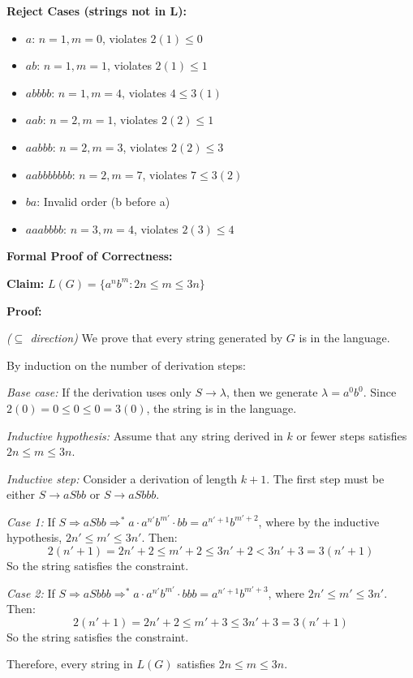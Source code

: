 \documentclass[12pt]{article}
\begin{document}
\textbf{Reject Cases (strings not in L):}
\begin{itemize}
\item $a$: $n=1, m=0$, violates $2(1) \le 0$ \texttimes
\item $ab$: $n=1, m=1$, violates $2(1) \le 1$ \texttimes
\item $abbbb$: $n=1, m=4$, violates $4 \le 3(1)$ \texttimes
\item $aab$: $n=2, m=1$, violates $2(2) \le 1$ \texttimes
\item $aabbb$: $n=2, m=3$, violates $2(2) \le 3$ \texttimes
\item $aabbbbbbb$: $n=2, m=7$, violates $7 \le 3(2)$ \texttimes
\item $ba$: Invalid order (b before a) \texttimes
\item $aaabbbb$: $n=3, m=4$, violates $2(3) \le 4$ \texttimes
\end{itemize}

\textbf{Formal Proof of Correctness:}

\textbf{Claim:} $L(G) = \{a^n b^m : 2n \le m \le 3n\}$

\textbf{Proof:}

\textit{($\subseteq$ direction)} We prove that every string generated by $G$ is in the language.

By induction on the number of derivation steps:

\textit{Base case:} If the derivation uses only $S \rightarrow \lambda$, then we generate $\lambda = a^0 b^0$. Since $2(0) = 0 \le 0 \le 0 = 3(0)$, the string is in the language.

\textit{Inductive hypothesis:} Assume that any string derived in $k$ or fewer steps satisfies $2n \le m \le 3n$.

\textit{Inductive step:} Consider a derivation of length $k+1$. The first step must be either $S \rightarrow aSbb$ or $S \rightarrow aSbbb$. 

\textit{Case 1:} If $S \Rightarrow aSbb \Rightarrow^* a \cdot a^{n'} b^{m'} \cdot bb = a^{n'+1} b^{m'+2}$, where by the inductive hypothesis, $2n' \le m' \le 3n'$. Then:
$$2(n'+1) = 2n' + 2 \le m' + 2 \le 3n' + 2 < 3n' + 3 = 3(n'+1)$$
So the string satisfies the constraint.

\textit{Case 2:} If $S \Rightarrow aSbbb \Rightarrow^* a \cdot a^{n'} b^{m'} \cdot bbb = a^{n'+1} b^{m'+3}$, where $2n' \le m' \le 3n'$. Then:
$$2(n'+1) = 2n' + 2 \le m' + 3 \le 3n' + 3 = 3(n'+1)$$
So the string satisfies the constraint.

Therefore, every string in $L(G)$ satisfies $2n \le m \le 3n$.
\end{document}
